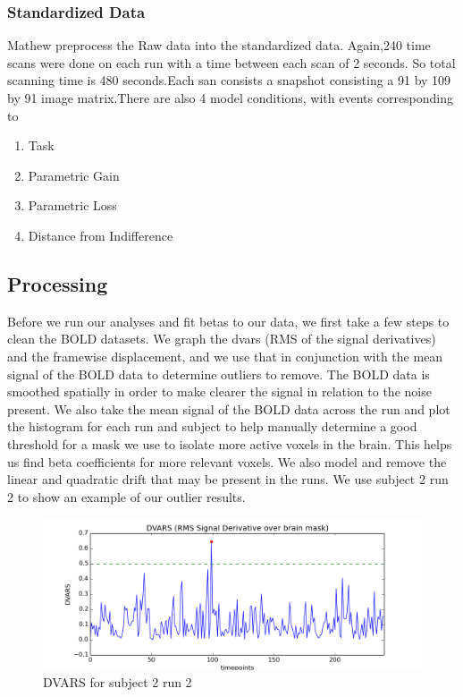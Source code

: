 \subsubsection{Standardized Data}
Mathew preprocess the Raw data into the standardized data. Again,240 time scans 
were done on each run with a time between each scan of 2 seconds. So total scanning 
time is 480 seconds.Each san consists a snapshot consisting a 91 by 109 by 91 image
matrix.There are also 4 model conditions, with events corresponding to 
\begin{enumerate}
  \item Task
  \item Parametric Gain
  \item Parametric Loss
  \item Distance from Indifference
\end{enumerate}

\subsection{Processing}
Before we run our analyses and fit betas to our data, we first take a few 
steps to clean the BOLD datasets. We graph the dvars (RMS of the signal 
derivatives) and the framewise displacement, and we use that in conjunction 
with the mean signal of the BOLD data to determine outliers to remove. The 
BOLD data is smoothed spatially in order to make clearer the signal in 
relation to the noise present. We also take the mean signal of the BOLD data 
across the run and plot the histogram for each run and subject to help 
manually determine a good threshold for a mask we use to isolate more active 
voxels in the brain. This helps us find beta coefficients for more relevant 
voxels. We also model and remove the linear and quadratic drift that may be 
present in the runs. 
We use subject 2 run 2 to show an example of our outlier results.

\begin{figure}[H]
    \centering
        \includegraphics[scale=0.5]{figures/dvars_sub2run2.png}
    \caption{DVARS for subject 2 run 2}
\end{figure}

